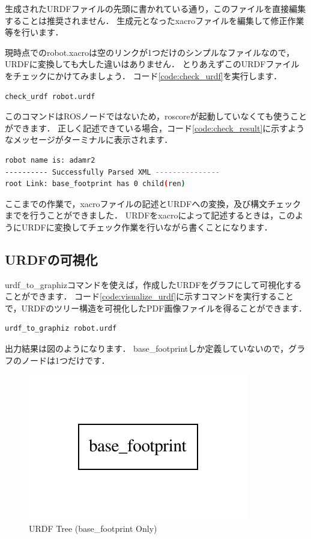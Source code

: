 \documentclass[{../../master}]{subfiles}
\begin{document}
生成されたURDFファイルの先頭に書かれている通り，このファイルを直接編集することは推奨されません．
生成元となった\textsf{xacro}ファイルを編集して修正作業等を行います．

現時点での\textsf{robot.xacro}は空のリンクが1つだけのシンプルなファイルなので，URDFに変換しても大した違いはありません．
とりあえずこのURDFファイルをチェックにかけてみましょう．
コード\ref{code:check_urdf}を実行します．

\begin{lstlisting}[language=sh, caption=Check URDF, label=code:check_urdf]
check_urdf robot.urdf
\end{lstlisting}

このコマンドはROSノードではないため，\textsf{roscore}が起動していなくても使うことができます．
正しく記述できている場合，コード\ref{code:check_result}に示すようなメッセージがターミナルに表示されます．

\begin{lstlisting}[language=sh, caption=Check Result, label=code:check_result]
robot name is: adamr2
---------- Successfully Parsed XML ---------------
root Link: base_footprint has 0 child(ren)
\end{lstlisting}

ここまでの作業で，\textsf{xacro}ファイルの記述とURDFへの変換，及び構文チェックまでを行うことができました．
URDFを\textsf{xacro}によって記述するときは，このようにURDFに変換してチェック作業を行いながら書くことになります．

\subsection{URDFの可視化}

\textsf{urdf\_to\_graphiz}コマンドを使えば，作成したURDFをグラフにして可視化することができます．
コード\ref{code:visualize_urdf}に示すコマンドを実行することで，URDFのツリー構造を可視化したPDF画像ファイルを得ることができます．

\begin{lstlisting}[language=sh, caption=Visualize URDF Tree, label=code:visualize_urdf]
urdf_to_graphiz robot.urdf
\end{lstlisting}

出力結果は図のようになります．
\textsf{base\_footprint}しか定義していないので，グラフのノードは1つだけです．

\begin{figure}[ht]
  \centering
  \includegraphics[width=70truemm, clip]{images/urdf_graph_only_base_footprint.pdf}
  \caption{URDF Tree (\textsf{base\_footprint} Only)}
  \label{fig:urdf_graph_only_base_footprint}
\end{figure}
\end{document}
